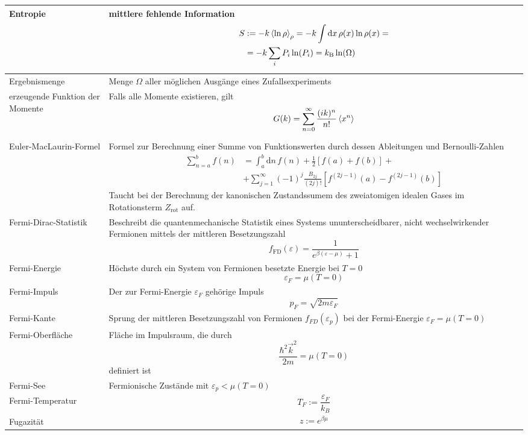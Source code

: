 \documentclass{article}
\newcommand{\diff}{\mathrm{d}}
\newcommand{\lreck}[1]{\left[#1\right]}
\begin{document}
\begin{xltabular}{\linewidth}{p{6cm}|X}
	\hline
		Entropie & mittlere fehlende Information
			{\begin{align*}
			S &:= -k\braket{\ln\rho}_\rho = -k\int \diff x\, \rho(x) \ln\rho(x) = \\
			 &= -k \sum_i P_i \ln(P_i) = k_\text{B} \ln(\Omega)
			 \end{align*}} \\
	\hline
		Ergebnismenge & Menge $\Omega$ aller möglichen Ausgänge eines Zufallsexperiments \\
	\hline
		erzeugende Funktion der Momente & Falls alle Momente existieren, gilt
			$$G(k) = \sum_{n=0}^\infty \frac{(ik)^n}{n!} \braket{x^n}$$ \\
	\hline
		Euler-MacLaurin-Formel & Formel zur Berechnung einer Summe von Funktionswerten durch dessen Ableitungen und Bernoulli-Zahlen
			{\begin{align*}
				\sum_{n=a}^b f(n) &= \int_a^b\diff n\, f(n) + \frac{1}{2} \lreck{ f(a) + f(b) } + \\
				&+ \sum_{j=1}^\infty (-1)^j \frac{B_{2j}}{(2j)!} \lreck{ f^{(2j-1)}(a) - f^{(2j-1)}(b) }
			\end{align*}}
		Taucht bei der Berechnung der kanonischen Zustandssumem des zweiatomigen idealen Gases im Rotationsterm $Z_\text{rot}$ auf. \\
	\hline
		Fermi-Dirac-Statistik & Beschreibt die quantenmechanische Statistik eines Systems ununterscheidbarer, nicht wechselwirkender Fermionen mittels der mittleren Besetzungszahl
			$$f_{\text{FD}}(\varepsilon) = \frac{1}{e^{\beta(\varepsilon - \mu)} + 1}$$ \\
	\hline
		Fermi-Energie & Höchste durch ein System von Fermionen besetzte Energie bei $T=0$
			$$\varepsilon_F = \mu(T=0)$$ \\
	\hline
		Fermi-Impuls & Der zur Fermi-Energie $\varepsilon_F$ gehörige Impuls
			$$p_F = \sqrt{2m\varepsilon_F}$$ \\
	\hline
		Fermi-Kante & Sprung der mittleren Besetzungszahl von Fermionen $f_{FD}(\varepsilon_p)$ bei der Fermi-Energie $\varepsilon_F = \mu(T=0)$ \\
	\hline
		Fermi-Oberfläche & Fläche im Impulsraum, die durch
			$$\frac{\hbar^2\vec{k}^2}{2m} = \mu(T=0)$$
			definiert ist \\
	\hline
		Fermi-See & Fermionische Zustände mit $\varepsilon_p < \mu(T=0)$ \\
	\hline
		Fermi-Temperatur & $$T_F := \frac{\varepsilon_F}{k_B}$$ \\
	\hline
		Fugazität & $$z := e^{\beta\mu}$$

\end{xltabular}
\end{document}

